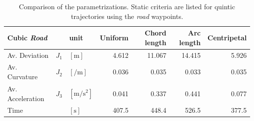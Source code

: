\begin{table}[H]
\begin{center}
 \begin{tabular}{lll|rrrr}
 \hline
 Cubic \textit{Road} & & unit & Uniform & Chord length & Arc length & Centripetal \\ \hline \hline
 Av. Deviation  & $J_1$ & $[\si{\meter}]$    & 4.612 & 11.067 & 14.415 & 5.926 \\
 Av. Curvature & $J_2$ & $[\si{\per\meter}]$ & 0.036 & 0.035 & 0.033 & 0.035 \\
 Av. Acceleration  & $J_3$ & $[\si{\meter\per\square\second}]$ &  0.041 & 0.337 & 0.441 & 0.077 \\
 Time      &   & $[\si{\second}]$ & 407.5 & 448.4 & 526.5 & 377.5 \\
 \hline
 \end{tabular}
 \caption{Comparison of the parametrizations. Static criteria are listed for quintic trajectories using the \textit{road} waypoints.}\vspace{1ex}
 \label{tab:app_results_parameterization_road_quintic}
\end{center}
\end{table}


